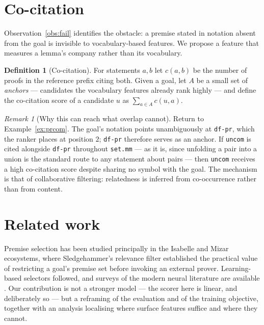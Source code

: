 \documentclass[11pt]{article}
\theoremstyle{plain}
\theoremstyle{definition}
\newtheorem{definition}[theorem]{Definition}
\theoremstyle{remark}
\newtheorem{remark}[theorem]{Remark}
\begin{document}
\section{Co-citation}\label{sec:cocite}

Observation~\ref{obs:fail} identifies the obstacle: a premise stated in notation
absent from the goal is invisible to vocabulary-based features. We propose a
feature that measures a lemma's company rather than its vocabulary.

\begin{definition}[Co-citation]\label{def:cocite}
For statements $a,b$ let $c(a,b)$ be the number of proofs in the reference prefix
citing both. Given a goal, let $A$ be a small set of \emph{anchors} --- candidates
the vocabulary features already rank highly --- and define the co-citation score
of a candidate $u$ as $\sum_{a\in A}c(u,a)$.
\end{definition}

\begin{remark}[Why this can reach what overlap cannot]
Return to Example~\ref{ex:prcom}. The goal's notation points unambiguously at
\texttt{df-pr}, which the ranker places at position $2$; \texttt{df-pr} therefore
serves as an anchor. If \texttt{uncom} is cited alongside \texttt{df-pr}
throughout \texttt{set.mm} --- as it is, since unfolding a pair into a union is
the standard route to any statement about pairs --- then \texttt{uncom} receives a
high co-citation score despite sharing no symbol with the goal. The mechanism is
that of collaborative filtering: relatedness is inferred from co-occurrence
rather than from content.
\end{remark}

\section{Related work}\label{sec:related}

Premise selection has been studied principally in the Isabelle and Mizar
ecosystems, where Sledgehammer's relevance filter \cite{sledgehammer} established
the practical value of restricting a goal's premise set before invoking an
external prover. Learning-based selectors followed, and surveys of the modern
neural literature are available \cite{survey}. Our contribution is not a stronger
model --- the scorer here is linear, and deliberately so --- but a reframing of
the evaluation and of the training objective, together with an analysis
localising where surface features suffice and where they cannot.
\end{document}

